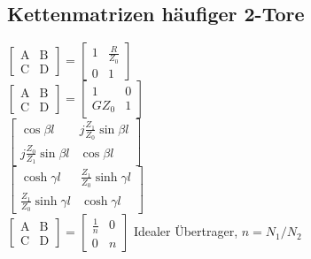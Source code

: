 \documentclass[english]{latex4ei/latex4ei_sheet}
\begin{document}
\begin{sectionbox}
	\subsection{Kettenmatrizen häufiger 2-Tore}
	$\left[\begin{array}{cc}
		\mathrm{A} & \mathrm{B} \\
		\mathrm{C} & \mathrm{D}
		\end{array}\right]=\left[\begin{array}{cc}
		1 & \frac{R}{Z_{0}} \\
		0 & 1
		\end{array}\right]$ \\
		$\left[\begin{array}{cc}
			\mathrm{A} & \mathrm{B} \\
			\mathrm{C} & \mathrm{D}
			\end{array}\right]=\left[\begin{array}{cc}
			1 & 0 \\
			G Z_{0} & 1
			\end{array}\right]$\\
		$\left[\begin{array}{cc}
			\cos \beta l & j \frac{Z_{1}}{Z_{0}} \sin \beta l \\
			j \frac{Z_{0}}{Z_{1}} \sin \beta l & \cos \beta l
			\end{array}\right]$\\
		$\left[\begin{array}{cc}
			\cosh \gamma l & \frac{Z_{1}}{Z_{0}} \sinh \gamma l \\
			\frac{Z_{1}}{Z_{0}} \sinh \gamma l & \cosh \gamma l
			\end{array}\right]$ \\
		$\left[\begin{array}{ll}
			\mathrm{A} & \mathrm{B} \\
			\mathrm{C} & \mathrm{D}
			\end{array}\right]=\left[\begin{array}{cc}
			\frac{1}{n} & 0 \\
			0 & n
			\end{array}\right]$ Idealer Übertrager, $n = N_1 / N_2$\\
\end{sectionbox}
\end{document}
